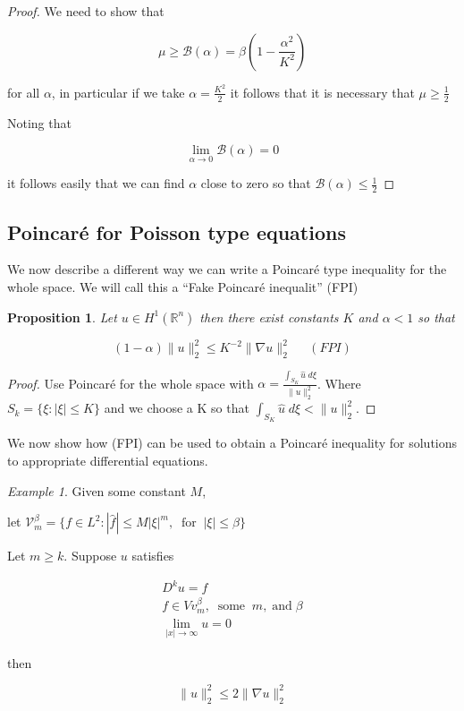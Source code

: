 \documentclass{amsart}
\numberwithin{Theorem}{section}
\numberwithin{equation}{section}
\newtheorem {Proposition}[Theorem]{Proposition}
\theoremstyle{definition}
\theoremstyle{remark}
\newtheorem{Example}[Theorem]{Example}
\begin{document}
\begin{proof}
We need to show that

\begin{equation} \label{eq:6}
\mu \geq  {{\mathcal B}}(\alpha) = \beta ( 1 - \frac{\alpha^2}{K^2}) \end{equation}

for all $\alpha$,   in particular if we take  $\alpha = \frac{K^2}{2}$ it follows that it is necessary that $\mu \geq \frac{1}{2}$

Noting that

\[\lim_{\alpha \to 0} {{\mathcal B}}(\alpha) =0\]

it follows easily that we can find $\alpha$ close to zero so that  ${{\mathcal B}}(\alpha)\leq \frac{1}{2}$

\end{proof}

\subsection{Poincar\'e for Poisson type equations}

We now describe a different way we can write a Poincar\'e type inequality for the whole space. We will call this a ``Fake Poincar\'e inequalit'' (FPI)

\begin{Proposition} Let $u\in H^1({{\mathbb R}^n})$ then there exist constants $K$ and $\alpha <1$ so that

\[ (1- \alpha) \|u\|_2^2 \leq K^{-2}  \|\nabla u\|_2^2\;\;\;\;\;(FPI) \]

\end{Proposition}

\begin{proof}

Use Poincar\'e for the whole space with $ \alpha = \frac{\int_{S_K}\widehat{u}\; d\xi}{\|u\|_2^2}$. Where
$S_k =\{\xi: |\xi |\leq K\} $ and we choose a K so that $\int_{S_K}\widehat{u}\; d\xi < \|u\|_2^2$.
\end{proof}

\bigskip

We now show how (FPI) can be used to obtain a Poincar\'e inequality for solutions to appropriate differential  equations.

\bigskip

\begin{Example}

Given some  constant $M$,

let  ${{\mathcal V}}_m^{\beta}=\{ f \in L^2:  |\widehat{f} | \leq M|\xi|^m,\;\; \mbox{for}\;\;|\xi|\leq  \beta\}$

Let $m\geq k$. Suppose $u$ satisfies

\begin{align}
D^{k}u = f\\
f \in Vv_m^{\beta},\;\;\mbox{some}\;\;m,\; \mbox{and}\; \beta \\
\lim_{|x| \to \infty} u =0\
\end{align}

then

 \[ \|u\|_2^2 \leq 2 \|\nabla u\|_2^2 \]

\end{Example}
\end{document}
